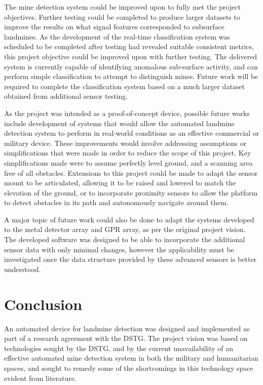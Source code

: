 \documentclass[main.tex]{subfiles}
\begin{document}
The mine detection system could be improved upon to fully met the project objectives. Further testing could be completed to produce larger datasets to improve the results on what signal features corresponded to subsurface landmines. As the development of the real-time classification system was scheduled to be completed after testing had revealed suitable consistent metrics, this project objective could be improved upon with further testing. The delivered system is currently capable of identifying anomalous sub-surface activity, and can perform simple classification to attempt to distinguish mines. Future work will be required to complete the classification system based on a much larger dataset obtained from additional sensor testing. 


As the project was intended as a proof-of-concept device, possible future works include development of systems that would allow the automated landmine detection system to perform in real-world conditions as an effective commercial or military device. These improvements would involve addressing assumptions or simplifications that were made in order to reduce the scope of this project. Key simplifications made were to assume perfectly level ground, and a scanning area free of all obstacles. Extensions to this project could be made to adapt the sensor mount to be articulated, allowing it to be raised and lowered to match the elevation of the ground, or to incorporate proximity sensors to allow the platform to detect obstacles in its path and autonomously navigate around them.

A major topic of future work could also be done to adapt the systems developed to the metal detector array and GPR array, as per the original project vision. The developed software was designed to be able to incorporate the additional sensor data with only minimal changes, however the applicability must be investigated once the data structure provided by these advanced sensors is better understood.

\section{Conclusion}
An automated device for landmine detection was designed and implemented as part of a research agreement with the DSTG. 
The project vision was based on technologies sought by the DSTG, and by the current unavailability of an effective automated mine detection system in both the military and humanitarian spaces, and sought to remedy some of the shortcomings in this technology space evident from literature.\\
\end{document}
